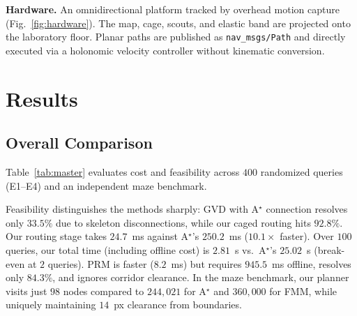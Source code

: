 \documentclass[conference]{IEEEtran}
\begin{document}
\textbf{Hardware.} An omnidirectional platform tracked by overhead motion capture (Fig.~\ref{fig:hardware}). The map, cage, scouts, and elastic band are projected onto the laboratory floor. Planar paths are published as \texttt{nav\_msgs/Path} and directly executed via a holonomic velocity controller without kinematic conversion.

\section{Results}
\label{sec:results}

\subsection{Overall Comparison}

Table~\ref{tab:master} evaluates cost and feasibility across $400$ randomized queries (E1--E4) and an independent maze benchmark.

Feasibility distinguishes the methods sharply: GVD with A$^\star$ connection resolves only $33.5\%$ due to skeleton disconnections, while our caged routing hits $92.8\%$. Our routing stage takes $24.7$~ms against A$^\star$'s $250.2$~ms ($10.1\times$ faster). Over $100$ queries, our total time (including offline cost) is $2.81$~s vs.\ A$^\star$'s $25.02$~s (break-even at $2$ queries). PRM is faster ($8.2$~ms) but requires $945.5$~ms offline, resolves only $84.3\%$, and ignores corridor clearance. In the maze benchmark, our planner visits just $98$ nodes compared to $244{,}021$ for A$^\star$ and $360{,}000$ for FMM, while uniquely maintaining $14$~px clearance from boundaries.
\end{document}

